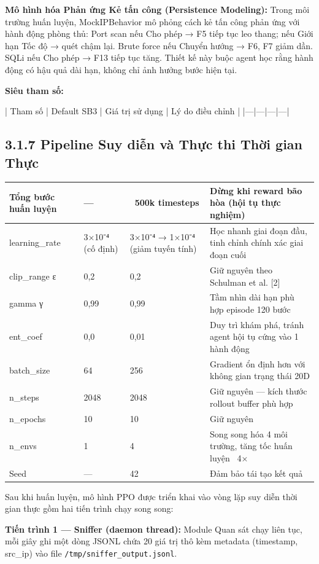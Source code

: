 \documentclass[12pt,a4paper,twoside]{report}
\begin{document}
{\textbf{Mô hình hóa Phản ứng Kẻ tấn công (Persistence Modeling):} Trong môi trường huấn luyện, MockIPBehavior mô phỏng cách kẻ tấn công phản ứng với hành động phòng thủ: Port scan nếu Cho phép → F5 tiếp tục leo thang; nếu Giới hạn Tốc độ → quét chậm lại. Brute force nếu Chuyển hướng → F6, F7 giảm dần. SQLi nếu Cho phép → F13 tiếp tục tăng. Thiết kế này buộc agent học rằng hành động có hậu quả dài hạn, không chỉ ảnh hưởng bước hiện tại.

\textbf{Siêu tham số:}

| Tham số | Default SB3 | Giá trị sử dụng | Lý do điều chỉnh |
|---|---|---|---|

\subsection{3.1.7 Pipeline Suy diễn và Thực thi Thời gian Thực}


\begin{tabular}{p{2.5cm}p{2.5cm}p{2.5cm}p{2.5cm}}
\hline
Tổng bước huấn luyện & — & ~500k timesteps & Dừng khi reward bão hòa (hội tụ thực nghiệm) \\
\hline
learning_rate & 3×10⁻⁴ (cố định) & 3×10⁻⁴ → 1×10⁻⁴ (giảm tuyến tính) & Học nhanh giai đoạn đầu, tinh chỉnh chính xác giai đoạn cuối \\
clip_range ε & 0,2 & 0,2 & Giữ nguyên theo Schulman et al. [2] \\
gamma γ & 0,99 & 0,99 & Tầm nhìn dài hạn phù hợp episode 120 bước \\
ent_coef & 0,0 & 0,01 & Duy trì khám phá, tránh agent hội tụ cứng vào 1 hành động \\
batch_size & 64 & 256 & Gradient ổn định hơn với không gian trạng thái 20D \\
n_steps & 2048 & 2048 & Giữ nguyên — kích thước rollout buffer phù hợp \\
n_epochs & 10 & 10 & Giữ nguyên \\
n_envs & 1 & 4 & Song song hóa 4 môi trường, tăng tốc huấn luyện ~4× \\
Seed & — & 42 & Đảm bảo tái tạo kết quả \\
\hline
\end{tabular}

Sau khi huấn luyện, mô hình PPO được triển khai vào vòng lặp suy diễn thời gian thực gồm hai tiến trình chạy song song:

\textbf{Tiến trình 1 — Sniffer (daemon thread):} Module Quan sát chạy liên tục, mỗi giây ghi một dòng JSONL chứa 20 giá trị thô kèm metadata (timestamp, src_ip) vào file \texttt{/tmp/sniffer_output.jsonl}.

}
\end{document}
